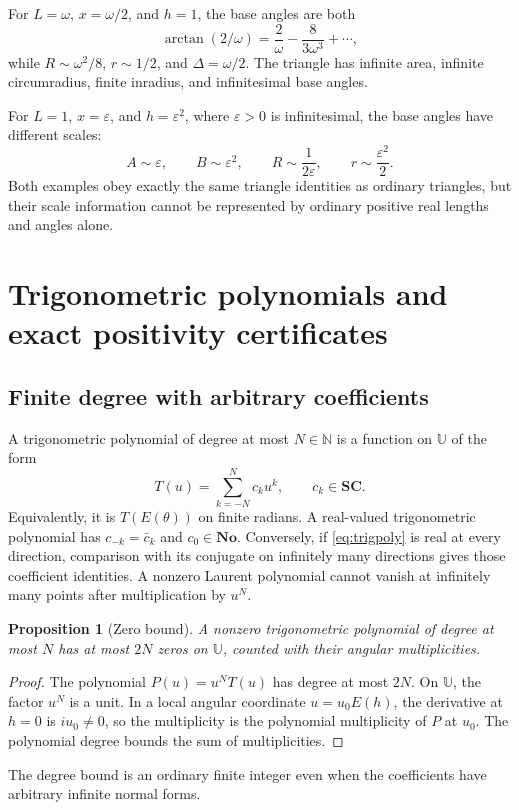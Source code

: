 \documentclass[11pt,letterpaper]{article}
\newtheorem{proposition}[theorem]{Proposition}
\theoremstyle{definition}
\theoremstyle{remark}
\newcommand{\No}{\mathbf{No}}
\newcommand{\SC}{\mathbf{SC}}
\newcommand{\N}{\mathbb N}\newcommand{\Z}{\mathbb Z}
\newcommand{\U}{\mathbb U}\newcommand{\PP}{\mathbb P}
\newcommand{\arct}{\operatorname{arctan}}
\numberwithin{equation}{section}
\begin{document}
For $L=\omega$, $x=\omega/2$, and $h=1$, the base angles are both
\[
 \arct(2/\omega)=\frac2\omega-\frac8{3\omega^3}+\cdots,
\]
while $R\sim\omega^2/8$, $r\sim1/2$, and $\Delta=\omega/2$. The triangle has infinite area, infinite circumradius, finite inradius, and infinitesimal base angles.

For $L=1$, $x=\varepsilon$, and $h=\varepsilon^2$, where $\varepsilon>0$ is infinitesimal, the base angles have different scales:
\[
 A\sim\varepsilon,\qquad B\sim\varepsilon^2,
 \qquad R\sim\frac1{2\varepsilon},\qquad r\sim\frac{\varepsilon^2}{2}.
\]
Both examples obey exactly the same triangle identities as ordinary triangles, but their scale information cannot be represented by ordinary positive real lengths and angles alone.

\section{Trigonometric polynomials and exact positivity certificates}\label{sec:polynomials}
\subsection{Finite degree with arbitrary coefficients}
A trigonometric polynomial of degree at most $N\in\N$ is a function on $\U$ of the form
\begin{equation}\label{eq:trigpoly}
 T(u)=\sum_{k=-N}^{N}c_ku^k,\qquad c_k\in\SC.
\end{equation}
Equivalently, it is $T(E(\theta))$ on finite radians. A real-valued trigonometric polynomial has $c_{-k}=\bar c_k$ and $c_0\in\No$. Conversely, if \eqref{eq:trigpoly} is real at every direction, comparison with its conjugate on infinitely many directions gives those coefficient identities. A nonzero Laurent polynomial cannot vanish at infinitely many points after multiplication by $u^N$.

\begin{proposition}[Zero bound]\label{prop:zerobound}
A nonzero trigonometric polynomial of degree at most $N$ has at most $2N$ zeros on $\U$, counted with their angular multiplicities.
\end{proposition}
\begin{proof}
The polynomial $P(u)=u^NT(u)$ has degree at most $2N$. On $\U$, the factor $u^N$ is a unit. In a local angular coordinate $u=u_0E(h)$, the derivative at $h=0$ is $iu_0\ne0$, so the multiplicity is the polynomial multiplicity of $P$ at $u_0$. The polynomial degree bounds the sum of multiplicities.
\end{proof}
The degree bound is an ordinary finite integer even when the coefficients have arbitrary infinite normal forms.
\end{document}
